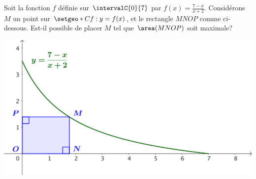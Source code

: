 Soit la fonction $f$ définie sur $\intervalC{0}{7}$ par $f(x) = \frac{7-x}{x+2}$.
%
Considérons $M$ un point sur $\setgeo*{C}{f}: y = f(x)$, et le rectangle $MNOP$ comme ci-dessous. Est-il possible de placer $M$ tel que $\area(MNOP)$ soit maximale?

\smallskip

\begin{center}
    \includegraphics[scale=.67]{goal.png}
\end{center}
